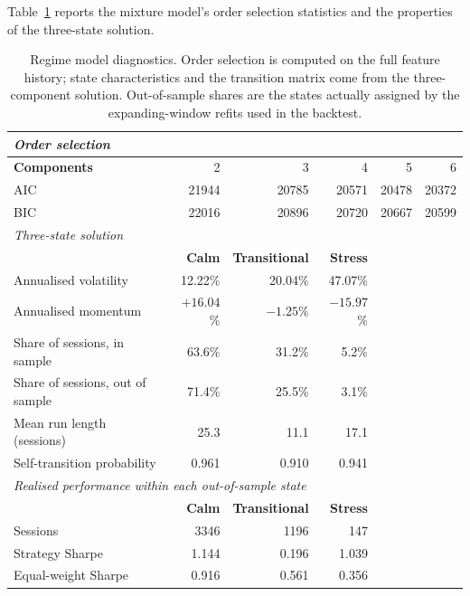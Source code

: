 Table~\ref{tab:regimefit} reports the mixture model's order selection statistics and the properties of
the three-state solution.

\begin{table}[!ht]
\centering
\caption{Regime model diagnostics. Order selection is computed on the full feature
history; state characteristics and the transition matrix come from the three-component
solution. Out-of-sample shares are the states actually assigned by the expanding-window
refits used in the backtest.}
\label{tab:regimefit}
\small
\begin{tabular}{p{3.2cm}rrrrr}
\hline
\multicolumn{6}{l}{\textit{Order selection}} \\
\hline
\textbf{Components} & 2 & 3 & 4 & 5 & 6 \\
AIC & 21944 & 20785 & 20571 & 20478 & 20372 \\
BIC & 22016 & 20896 & 20720 & 20667 & 20599 \\
\hline
\multicolumn{6}{l}{\textit{Three-state solution}} \\
\hline
& \textbf{Calm} & \textbf{Transitional} & \textbf{Stress} & & \\
Annualised volatility & 12.22\% & 20.04\% & 47.07\% & & \\
Annualised momentum & $+16.04$\% & $-1.25$\% & $-15.97$\% & & \\
Share of sessions, in sample & 63.6\% & 31.2\% & 5.2\% & & \\
Share of sessions, out of sample & 71.4\% & 25.5\% & 3.1\% & & \\
Mean run length (sessions) & 25.3 & 11.1 & 17.1 & & \\
Self-transition probability & 0.961 & 0.910 & 0.941 & & \\
\hline
\multicolumn{6}{l}{\textit{Realised performance within each out-of-sample state}} \\
\hline
& \textbf{Calm} & \textbf{Transitional} & \textbf{Stress} & & \\
Sessions & 3346 & 1196 & 147 & & \\
Strategy Sharpe & 1.144 & 0.196 & 1.039 & & \\
Equal-weight Sharpe & 0.916 & 0.561 & 0.356 & & \\
\hline
\end{tabular}
\end{table}

